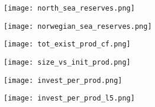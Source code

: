 \documentclass{beamer}
\begin{document}

\begin{frame}[plain]
	\begin{figure}
	\texttt{[image: north\_sea\_reserves.png]}
	\end{figure}
\end{frame}


\begin{frame}[plain]
	\begin{figure}
	\texttt{[image: norwegian\_sea\_reserves.png]}
	\end{figure}
\end{frame}


\begin{frame}[plain]
	\begin{figure}
	\texttt{[image: tot\_exist\_prod\_cf.png]}
	\end{figure}
\end{frame}


\begin{frame}[plain]
	\begin{figure}
	\texttt{[image: size\_vs\_init\_prod.png]}
	\end{figure}
\end{frame}


\begin{frame}[plain]
	\begin{figure}
	\texttt{[image: invest\_per\_prod.png]}
	\end{figure}
\end{frame}


\begin{frame}[plain]
	\begin{figure}
	\texttt{[image: invest\_per\_prod\_l5.png]}
	\end{figure}
\end{frame}


\end{document}
